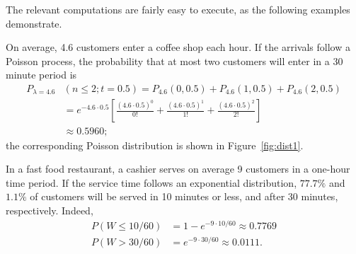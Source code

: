 The relevant computations are fairly easy to execute, as the following examples demonstrate.
\begin{Example} On average, 4.6 customers enter a coffee shop each hour. If the arrivals follow a Poisson process, the probability that at most two customers will enter in a 30 minute period is \begin{align*}P_{\lambda=4.6}&(n\leq 2;t=0.5)=P_{4.6}(0,0.5)+P_{4.6}(1,0.5)+P_{4.6}(2,0.5) \\ &=e^{-4.6\cdot 0.5}\left[\frac{(4.6\cdot 0.5)^0}{0!}+\frac{(4.6\cdot 0.5)^1}{1!}+\frac{(4.6\cdot 0.5)^2}{2!}\right] \\ &\approx 0.5960; \end{align*} the corresponding Poisson distribution is shown in Figure~\ref{fig:dist1}.
\end{Example}
\begin{Example}
 In a fast food restaurant, a cashier serves on average 9 customers in a one-hour time period. If the service time follows an exponential distribution, $77.7\%$ and $1.1\%$ of customers will be served in 10 minutes or less, and after 30 minutes, respectively. Indeed, \begin{align*}P(W\leq 10/60)&=1-e^{-9 \cdot 10/60} \approx 0.7769\\ P(W>30/60)&=e^{-9\cdot 30/60}\approx 0.0111.\end{align*}
\end{Example}

